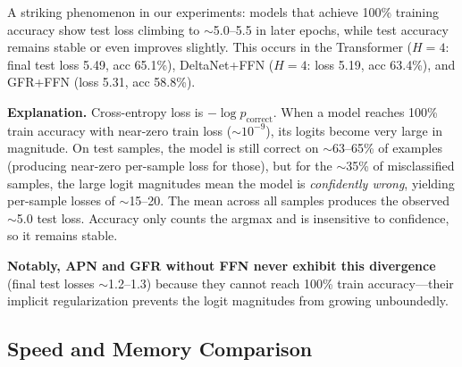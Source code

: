 \documentclass[11pt,a4paper]{article}
\begin{document}
A striking phenomenon in our experiments: models that achieve 100\% training accuracy show test loss climbing to $\sim$5.0--5.5 in later epochs, while test accuracy remains stable or even improves slightly.
This occurs in the Transformer ($H{=}4$: final test loss 5.49, acc 65.1\%), DeltaNet+FFN ($H{=}4$: loss 5.19, acc 63.4\%), and GFR+FFN (loss 5.31, acc 58.8\%).

\textbf{Explanation.} Cross-entropy loss is $-\log p_{\text{correct}}$.
When a model reaches 100\% train accuracy with near-zero train loss ($\sim 10^{-9}$), its logits become very large in magnitude.
On test samples, the model is still correct on $\sim$63--65\% of examples (producing near-zero per-sample loss for those), but for the $\sim$35\% of misclassified samples, the large logit magnitudes mean the model is \emph{confidently wrong}, yielding per-sample losses of $\sim$15--20.
The mean across all samples produces the observed $\sim$5.0 test loss.
Accuracy only counts the argmax and is insensitive to confidence, so it remains stable.

\textbf{Notably, APN and GFR without FFN never exhibit this divergence} (final test losses $\sim$1.2--1.3) because they cannot reach 100\% train accuracy---their implicit regularization prevents the logit magnitudes from growing unboundedly.

\subsection{Speed and Memory Comparison}
\end{document}
